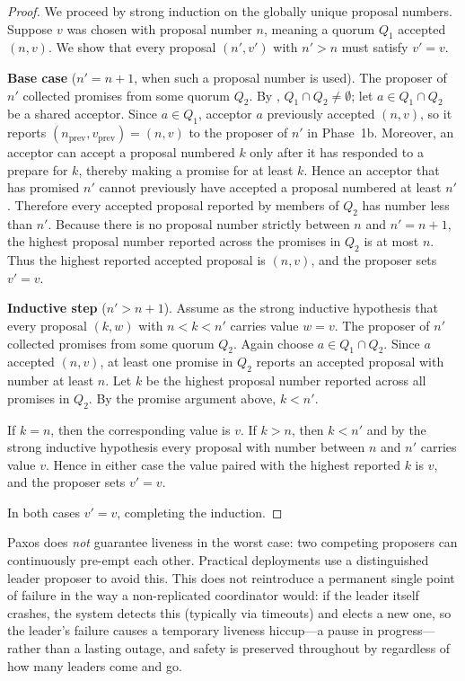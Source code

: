 \begin{proof}
We proceed by strong induction on the globally unique proposal numbers. Suppose $v$ was chosen with proposal number $n$, meaning a quorum $Q_1$ accepted $(n,v)$. We show that every proposal $(n',v')$ with $n'>n$ must satisfy $v'=v$.

\medskip
\textbf{Base case} ($n'=n+1$, when such a proposal number is used). The proposer of $n'$ collected promises from some quorum $Q_2$. By , $Q_1\cap Q_2\neq\emptyset$; let $a\in Q_1\cap Q_2$ be a shared acceptor. Since $a\in Q_1$, acceptor $a$ previously accepted $(n,v)$, so it reports $(n_{\mathrm{prev}},v_{\mathrm{prev}})=(n,v)$ to the proposer of $n'$ in Phase~1b. Moreover, an acceptor can accept a proposal numbered $k$ only after it has responded to a prepare for $k$, thereby making a promise for at least $k$. Hence an acceptor that has promised $n'$ cannot previously have accepted a proposal numbered at least $n'$. Therefore every accepted proposal reported by members of $Q_2$ has number less than $n'$. Because there is no proposal number strictly between $n$ and $n'=n+1$, the highest proposal number reported across the promises in $Q_2$ is at most $n$. Thus the highest reported accepted proposal is $(n,v)$, and the proposer sets $v'=v$.

\medskip
\textbf{Inductive step} ($n'>n+1$). Assume as the strong inductive hypothesis that every proposal $(k,w)$ with $n<k<n'$ carries value $w=v$. The proposer of $n'$ collected promises from some quorum $Q_2$. Again choose $a\in Q_1\cap Q_2$. Since $a$ accepted $(n,v)$, at least one promise in $Q_2$ reports an accepted proposal with number at least $n$. Let $k$ be the highest proposal number reported across all promises in $Q_2$. By the promise argument above, $k<n'$.

If $k=n$, then the corresponding value is $v$. If $k>n$, then $k<n'$ and by the strong inductive hypothesis every proposal with number between $n$ and $n'$ carries value $v$. Hence in either case the value paired with the highest reported $k$ is $v$, and the proposer sets $v'=v$.

\medskip
In both cases $v'=v$, completing the induction.
\end{proof}
\begin{smjremark}
Paxos does \emph{not} guarantee liveness in the worst case: two competing proposers can continuously pre-empt each other. Practical deployments use a distinguished leader proposer to avoid this. This does not reintroduce a permanent single point of failure in the way a non-replicated coordinator would: if the leader itself crashes, the system detects this (typically via timeouts) and elects a new one, so the leader's failure causes a temporary liveness hiccup---a pause in progress---rather than a lasting outage, and safety is preserved throughout by  regardless of how many leaders come and go.
\end{smjremark}

